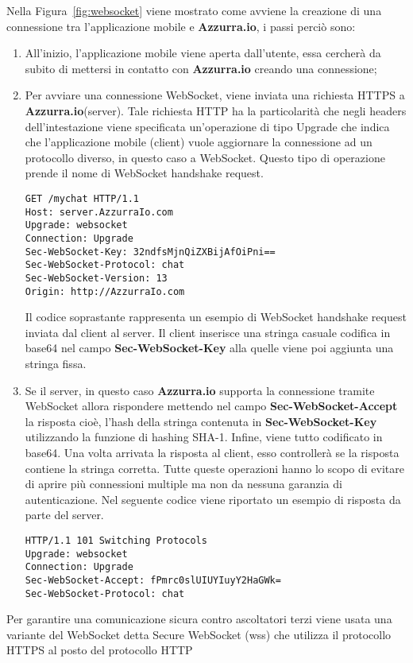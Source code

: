 Nella Figura~\ref{fig:websocket} viene mostrato come avviene la creazione di una connessione tra l'applicazione mobile e \textbf{Azzurra.io}, i passi perciò sono:
\begin{enumerate}
	\item All'inizio, l'applicazione mobile viene aperta dall'utente, essa cercherà da subito di mettersi in contatto con \textbf{Azzurra.io} creando una connessione;
	\item Per avviare una connessione WebSocket, viene inviata una richiesta HTTPS a \textbf{Azzurra.io}(server). Tale richiesta HTTP ha la particolarità che negli headers dell’intestazione viene specificata un'operazione di tipo Upgrade che indica che l'applicazione mobile (client) vuole aggiornare la connessione ad un protocollo diverso, in questo caso a WebSocket. Questo tipo di operazione prende il nome di WebSocket handshake request.\\
	\begin{lstlisting}
GET /mychat HTTP/1.1
Host: server.AzzurraIo.com
Upgrade: websocket	
Connection: Upgrade		
Sec-WebSocket-Key: 32ndfsMjnQiZXBijAfOiPni==
Sec-WebSocket-Protocol: chat		
Sec-WebSocket-Version: 13		
Origin: http://AzzurraIo.com
	\end{lstlisting}
	Il codice soprastante rappresenta un esempio di WebSocket handshake request inviata dal client al server. Il client inserisce una stringa casuale codifica in base64 nel campo \textbf{Sec-WebSocket-Key} alla quelle viene poi aggiunta una stringa fissa.
	\item Se il server, in questo caso \textbf{Azzurra.io} supporta la connessione tramite WebSocket allora rispondere mettendo nel campo \textbf{Sec-WebSocket-Accept} la risposta cioè, l'hash della stringa contenuta in \textbf{Sec-WebSocket-Key} utilizzando la funzione di hashing SHA-1. Infine, viene tutto codificato in base64. Una volta arrivata la risposta al client, esso controllerà se la risposta contiene la stringa corretta. Tutte queste operazioni hanno lo scopo di evitare di aprire più connessioni multiple ma non da nessuna garanzia di autenticazione.
	Nel seguente codice viene riportato un esempio di risposta da parte del server.\\
	\begin{lstlisting}
HTTP/1.1 101 Switching Protocols
Upgrade: websocket
Connection: Upgrade
Sec-WebSocket-Accept: fPmrc0slUIUYIuyY2HaGWk=
Sec-WebSocket-Protocol: chat
	\end{lstlisting}
\end{enumerate}
Per garantire una comunicazione sicura contro ascoltatori terzi viene usata una variante del WebSocket detta Secure WebSocket (wss) che utilizza il protocollo HTTPS al posto del protocollo HTTP
